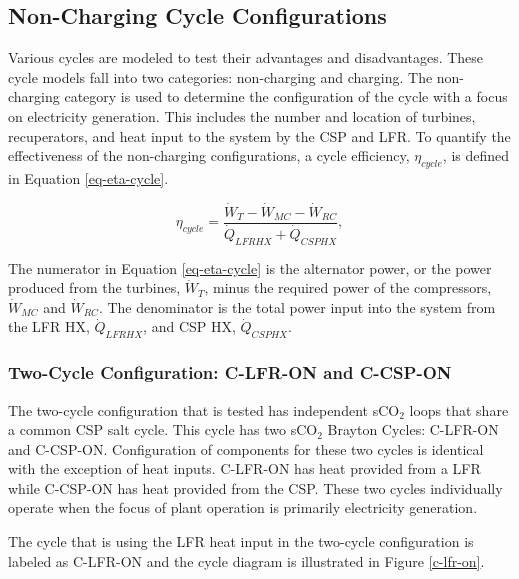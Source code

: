 \subsection{Non-Charging Cycle Configurations} 

Various cycles are modeled to test their advantages and disadvantages. These cycle models fall into two categories: non-charging and charging. The non-charging category is used to determine the configuration of the cycle with a focus on electricity generation. This includes the number and location of turbines, recuperators, and heat input to the system by the CSP and LFR. To quantify the effectiveness of the non-charging configurations, a cycle efficiency, $\eta_{cycle}$, is defined in Equation \ref{eq-eta-cycle}.

\begin{equation}
    \label{eq-eta-cycle}
    \eta_{cycle} = \frac{\dot{W}_{T}-\dot{W}_{MC}-\dot{W}_{RC}}{\dot{Q}_{LFRHX}+\dot{Q}_{CSPHX}},
\end{equation}

The numerator in Equation \ref{eq-eta-cycle} is the alternator power, or the power produced from the turbines, $\dot{W}_{T}$, minus the required power of the compressors, $\dot{W}_{MC}$ and $\dot{W}_{RC}$. The denominator is the total power input into the system from the LFR HX, $\dot{Q}_{LFRHX}$, and CSP HX, $\dot{Q}_{CSPHX}$.


\subsubsection{Two-Cycle Configuration: C-LFR-ON and C-CSP-ON} %

The two-cycle configuration that is tested has independent sCO$_{2}$ loops that share a common CSP salt cycle. This cycle has two sCO$_{2}$ Brayton Cycles: C-LFR-ON and C-CSP-ON. Configuration of components for these two cycles is identical with the exception of heat inputs. C-LFR-ON has heat provided from a LFR while C-CSP-ON has heat provided from the CSP. These two cycles individually operate when the focus of plant operation is primarily electricity generation. 
    
The cycle that is using the LFR heat input in the two-cycle configuration is labeled as C-LFR-ON and the cycle diagram is illustrated in Figure \ref{c-lfr-on}. 

